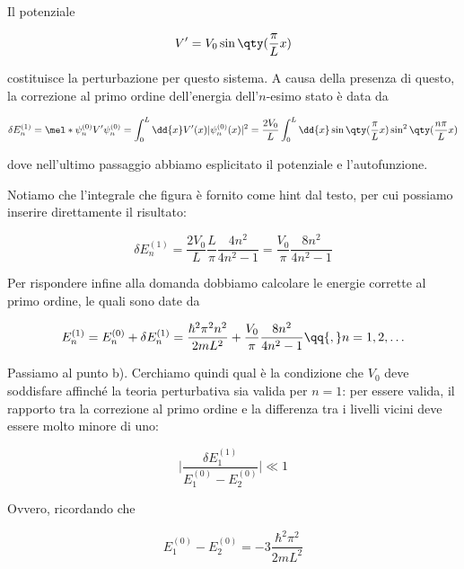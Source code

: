 \begin{soluzione}
   Il potenziale
   
   \begin{equation*}
      V'=V_0\sin\qty( \frac{\pi}{L} x)
   \end{equation*}

   costituisce la perturbazione per questo sistema. A causa della presenza di questo, la correzione al primo ordine dell'energia dell'$n$-esimo stato è data da
   
   \begin{equation*}
      \delta E_n^{(1)}
      =\mel*{\psi_n^{(0)}}{V'}{\psi_n^{(0)}}
      =\int_{0}^{L} \dd{x} V'(x) |\psi_n^{(0)}(x)|^2
      =\frac{2V_0}{L} \int_{0}^{L} \dd{x} \sin{\qty( \frac{\pi}{L} x )} \sin^2{\qty( \frac{n\pi}{L} x )}
   \end{equation*}
   
   dove nell'ultimo passaggio abbiamo esplicitato il potenziale e l'autofunzione.

   Notiamo che l'integrale che figura è fornito come hint dal testo, per cui possiamo inserire direttamente il risultato:

   \begin{equation}
      \delta E_n^{(1)}
      =\frac{2V_0}{L} \frac{L}{\pi} \frac{4n^2}{4n^2 - 1}
      =\frac{V_0}{\pi} \frac{8n^2}{4n^2 - 1}
      \label{eq:correzione_al_primo_ordine_livelli_buca}
   \end{equation}
   
   Per rispondere infine alla domanda dobbiamo calcolare le energie corrette al primo ordine, le quali sono date da

   \begin{equation*}
      E_n^{(1)}
      =E_n^{(0)} + \delta E_n^{(1)}
      =\frac{\hbar^2 \pi^2 n^2}{2mL^2} + \frac{V_0}{\pi} \frac{8n^2}{4n^2 - 1}
      \qq{,}
      n=1,2,\ldots
   \end{equation*}

   Passiamo al punto b). Cerchiamo quindi qual è la condizione che $V_0$ deve soddisfare affinché la teoria perturbativa sia valida per $n=1$: per essere valida, il rapporto tra la correzione al primo ordine e la differenza tra i livelli vicini deve essere molto minore di uno:
   
   \begin{equation*}
      \biggl| \frac{\delta E_1^{(1)}}{ E_1^{(0)} - E_2^{(0)} } \biggr| \ll 1
   \end{equation*}

   Ovvero, ricordando che

   \begin{equation*}
      E_1^{(0)} - E_2^{(0)}
      =-3 \frac{\hbar^2 \pi^2}{2 m L^2}
   \end{equation*}
   

\end{soluzione}
